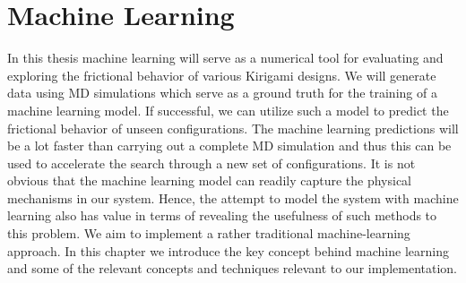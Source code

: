 \chapter{Machine Learning}\label{chap:ML}
In this thesis machine learning will serve as a numerical tool for evaluating
and exploring the frictional behavior of various Kirigami designs. We will
generate data using \acrshort{MD} simulations which serve as a ground truth for
the training of a machine learning model. If successful, we can utilize such a
model to predict the frictional behavior of unseen configurations. The machine
learning predictions will be a lot faster than carrying out a complete
\acrshort{MD} simulation and thus this can be used to accelerate the search
through a new set of configurations. It is not obvious that the machine learning
model can readily capture the physical mechanisms in our system. Hence, the
attempt to model the system with machine learning also has value in terms of
revealing the usefulness of such methods to this problem. We aim to implement a
rather traditional machine-learning approach. In this chapter we introduce the
key concept behind machine learning and some of the relevant concepts and
techniques relevant to our implementation.


